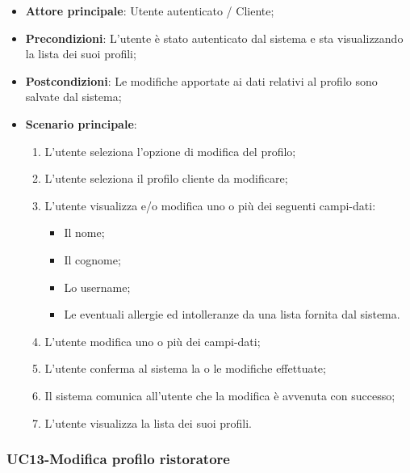 \begin{itemize}
\item \textbf{Attore principale}: Utente autenticato / Cliente;
\item \textbf{Precondizioni}: L'utente è stato autenticato dal sistema e sta visualizzando la lista dei suoi profili;
\item \textbf{Postcondizioni}: Le modifiche apportate ai dati relativi al profilo sono salvate dal sistema;
\item \textbf{Scenario principale}:
\begin{enumerate}
\item L'utente seleziona l'opzione di modifica del profilo;
\item L'utente seleziona il profilo cliente da modificare;
\item L'utente visualizza e/o modifica uno o più dei seguenti campi-dati:
\begin{itemize}
\item Il nome;
\item Il cognome;
\item Lo username;
\item Le eventuali allergie ed intolleranze da una lista fornita dal sistema.
\end{itemize}
\item L'utente modifica uno o più dei campi-dati;
\item L'utente conferma al sistema la o le modifiche effettuate;
\item Il sistema comunica all'utente che la modifica è avvenuta con successo;
\item L'utente visualizza la lista dei suoi profili.
\end{enumerate}
\end{itemize}

\subsubsection{UC13-Modifica profilo ristoratore}

